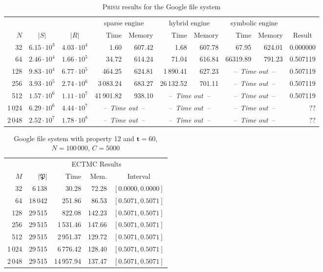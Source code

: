 \documentclass[10pt,twocolumn]{article}
\newcommand{\PRISM}{\textsc{Prism}\xspace}
\newcommand{\timelimit}{\emph{--~Time out~--}}
\newcommand{\timeb}{\mathbf{t}}
\newcommand{\apart}{\mathfrak{P}}
\begin{document}
\begin{table*}
  \centering
  \caption{\PRISM results for the Google file system}
  \label{tab:google_detailed_prism}
\begin{tabular}{|rrr|rr|rr|rr|r|}
  \hline
    &&  & \multicolumn{2}{c|}{sparse engine} & \multicolumn{2}{c|}{hybrid engine} & \multicolumn{2}{c|}{symbolic engine} & \\
  $N$ & \multicolumn{1}{c}{$|S|$} & \multicolumn{1}{c|}{$|R|$} & Time & Memory & Time & Memory & Time & Memory & \multicolumn{1}{c|}{Result} \\
  \hline
  32  & $ 6.15 \cdot 10^{3} $ & $ 4.03 \cdot 10^{4} $ & 1.60 & 607.42 & 1.68 & 607.78 & 67.95 & 624.01 & 0.000000 \\
  64  & $ 2.46 \cdot 10^{4} $ & $ 1.66 \cdot 10^{5} $ & 34.72 & 614.24 & 71.04 & 616.84 & 66319.89 & 791.23 & 0.507119\\
  128 & $ 9.83 \cdot 10^{4} $ & $ 6.77 \cdot 10^{5} $ & 464.25 & 624.81 & 1\,890.41 & 627.23 & \multicolumn{2}{c|}{\timelimit} & 0.507119 \\
  256 & $ 3.93 \cdot 10^{5} $ & $ 2.74 \cdot 10^{6} $ & 3\,083.24 & 683.27 & 26\,132.52 & 701.11 & \multicolumn{2}{c|}{\timelimit} & 0.507119 \\
  512 & $ 1.57 \cdot 10^{6} $ & $ 1.11 \cdot 10^{7} $ & 41\,901.82 & 938.10 & \multicolumn{2}{c|}{\timelimit} & \multicolumn{2}{c|}{\timelimit} & 0.507119 \\
  1\,024 & $ 6.29 \cdot 10^{6} $ & $ 4.44 \cdot 10^{7} $ & \multicolumn{2}{c|}{\timelimit} & \multicolumn{2}{c|}{\timelimit} & \multicolumn{2}{c|}{\timelimit} & ?? \\
  2\,048 & $ 2.52 \cdot 10^{7} $ & $ 1.78 \cdot 10^{8} $ & \multicolumn{2}{c|}{\timelimit} & \multicolumn{2}{c|}{\timelimit} & \multicolumn{2}{c|}{\timelimit} & ?? \\
  \hline
\end{tabular}
\end{table*}

\begin{table}[tb]
  \centering
  \caption{\label{tab:google}Google file system with property 12 and $\timeb=60$, $N=100\,000$, $C=5000$}
\begin{tabular}{|r|rrrc|}
\hline
     & \multicolumn{4}{c|}{ECTMC Results} \\
 $M$ & $|\apart|$ & Time & Mem. & Interval \\
\hline
32 & 6\,138 & 30.28 & 72.28 & $[ 0.0000, 0.0000]$ \\
64 & 18\,042 & 251.86 & 86.53 & $[ 0.5071, 0.5071]$ \\
128 & 29\,515 & 822.08 & 142.23 & $[ 0.5071, 0.5071]$ \\
256 & 29\,515 & 1\,531.46 & 147.66 & $[ 0.5071, 0.5071]$ \\
512 & 29\,515 & 2\,951.37 & 129.72 & $[ 0.5071, 0.5071]$ \\
1\,024 & 29\,515 & 6\,776.42 & 128.40 & $[ 0.5071, 0.5071]$ \\
2\,048 & 29\,515 & 14\,957.94 & 137.47 & $[ 0.5071, 0.5071]$ \\
\hline
\end{tabular}
\end{table}
\end{document}
